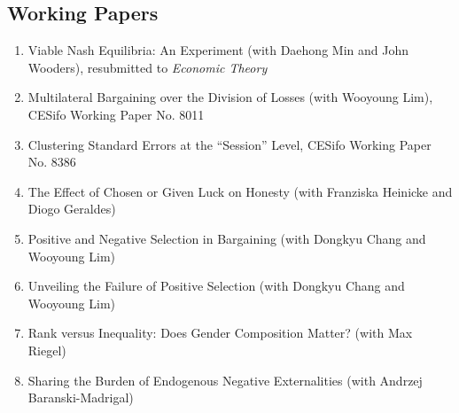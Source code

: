 \documentclass[margin, a4paper]{res}
\begin{document}
\begin{resume}
\section{Working Papers}
\begin{enumerate}[leftmargin=*]
\item Viable Nash Equilibria: An Experiment (with Daehong Min and John Wooders), resubmitted to \emph{Economic Theory}
\item Multilateral Bargaining over the Division of Losses (with Wooyoung Lim), CESifo Working Paper No. 8011
\item Clustering Standard Errors at the ``Session'' Level, CESifo Working Paper No. 8386
\item The Effect of Chosen or Given Luck on Honesty (with Franziska Heinicke and Diogo Geraldes)
\item Positive and Negative Selection in Bargaining (with Dongkyu Chang and Wooyoung Lim)
\item Unveiling the Failure of Positive Selection (with Dongkyu Chang and Wooyoung Lim)
\item Rank versus Inequality: Does Gender Composition Matter? (with Max Riegel)
\item Sharing the Burden of Endogenous Negative Externalities (with Andrzej Baranski-Madrigal)
\end{enumerate}



\end{resume}
\end{document}
